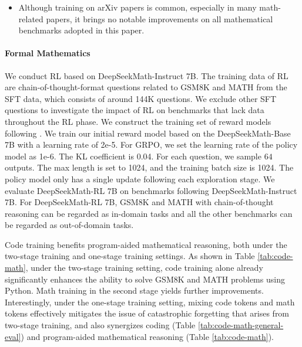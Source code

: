\begin{itemize}[topsep=0pt]
After pre-training, we apply mathematical instruction tuning to DeepSeekMath-Base with chain-of-thought \citep{cot}, program-of-thought \citep{pot,pal}, and tool-integrated reasoning \citep{tora} data. The resulting model DeepSeekMath-Instruct 7B beats all 7B counterparts and is comparable with 70B open-source instruction-tuned models.  

    \item Although training on arXiv papers is common, especially in many math-related papers, it brings no notable improvements on all mathematical benchmarks adopted in this paper.
\end{itemize}

\paragraph{Formal Mathematics}

We conduct RL based on DeepSeekMath-Instruct 7B. The training data of RL are chain-of-thought-format questions related to GSM8K and MATH from the SFT data, which consists of around 144K questions. We exclude other SFT questions to investigate the impact of RL on benchmarks that lack data throughout the RL phase. We construct the training set of reward models following \citep{wang2023math}. We train our initial reward model based on the DeepSeekMath-Base 7B with a learning rate of 2e-5. For GRPO, we set the learning rate of the policy model as 1e-6. The KL coefficient is 0.04. For each question, we sample $64$ outputs.  The max length is set to 1024, and the training batch size is 1024. The policy model only has a single update following each exploration stage. We evaluate DeepSeekMath-RL 7B on benchmarks following DeepSeekMath-Instruct 7B. For DeepSeekMath-RL 7B, GSM8K and MATH with chain-of-thought reasoning can be regarded as in-domain tasks and all the other benchmarks can be regarded as out-of-domain tasks.

Code training benefits program-aided mathematical reasoning, both under the two-stage training and one-stage training settings. As shown in Table \ref{tab:code-math}, under the two-stage training setting, code training alone already significantly enhances the ability to solve GSM8K and MATH problems using Python. Math training in the second stage yields further improvements. Interestingly, under the one-stage training setting, mixing code tokens and math tokens effectively mitigates the issue of catastrophic forgetting that arises from two-stage training, and also synergizes coding (Table \ref{tab:code-math-general-eval}) and program-aided mathematical reasoning (Table \ref{tab:code-math}).

